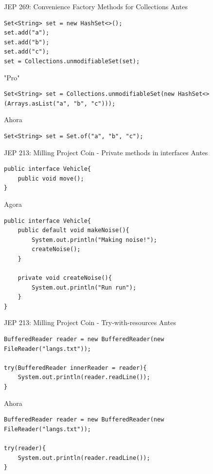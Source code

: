 \documentclass[aspectratio=169]{beamer}
\begin{document}
\begin{frame}[fragile]{JEP 269: Convenience Factory Methods for Collections}
Antes
\begin{lstlisting}
Set<String> set = new HashSet<>();
set.add("a");
set.add("b");
set.add("c");
set = Collections.unmodifiableSet(set);
\end{lstlisting}	

"Pro"
\begin{lstlisting}
Set<String> set = Collections.unmodifiableSet(new HashSet<>(Arrays.asList("a", "b", "c")));
\end{lstlisting}	

Ahora
\begin{lstlisting}
Set<String> set = Set.of("a", "b", "c");
\end{lstlisting}
\end{frame}


\begin{frame}[fragile]{JEP 213: Milling Project Coin - Private methods in interfaces}
Antes
\begin{lstlisting}
public interface Vehicle{
    public void move();
}
\end{lstlisting}	

Agora
\begin{lstlisting}[basicstyle=\scriptsize]
public interface Vehicle{
    public default void makeNoise(){
        System.out.println("Making noise!");
        createNoise();
    }

    private void createNoise(){
        System.out.println("Run run");
    } 
}
\end{lstlisting}	
    
\end{frame}

\begin{frame}[fragile]{JEP 213: Milling Project Coin - Try-with-resources}
Antes
\begin{lstlisting}
BufferedReader reader = new BufferedReader(new FileReader("langs.txt"));

try(BufferedReader innerReader = reader){
    System.out.println(reader.readLine());
}
\end{lstlisting}	

Ahora
\begin{lstlisting}
BufferedReader reader = new BufferedReader(new FileReader("langs.txt"));

try(reader){
    System.out.println(reader.readLine());
}
\end{lstlisting}	
    
\end{frame}
\end{document}
